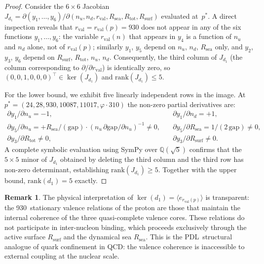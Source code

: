 \documentclass[11pt,a4paper]{article}
\theoremstyle{definition}
\newtheorem{remark}[theorem]{Remark}
\newcommand{\PDL}{\textnormal{PDL}}
\newcommand{\Rsurf}{R_{\mathrm{surf}}}
\newcommand{\Rsea}{R_{\mathrm{sea}}}
\newcommand{\Rtot}{R_{\mathrm{tot}}}
\newcommand{\rval}{r_{\mathrm{val}}}
\newcommand{\rank}{\mathrm{rank}}
\newcommand{\dmap}[1]{d_{#1}}
\newcommand{\vp}{\varphi}
\begin{document}
\begin{proof}
Consider the $6 \times 6$ Jacobian $J_{\dmap{1}} = \partial(y_1,\ldots,y_6)/\partial(n_u, n_d, \rval, \Rsea, \Rtot, \Rsurf)$ evaluated at~$p^*$. A direct inspection reveals that $\rval = \rval(p) = 930$ does not appear in any of the six functions $y_1,\ldots,y_6$: the variable $\rval(n)$ that appears in $y_4$ is a function of $n_u$ and $n_d$ alone, not of $\rval(p)$; similarly $y_1$, $y_5$ depend on $n_u$, $n_d$, $\Rsea$ only, and $y_2$, $y_3$, $y_6$ depend on $\Rsurf$, $\Rtot$, $n_u$, $n_d$. Consequently, the third column of $J_{\dmap{1}}$ (the column corresponding to $\partial/\partial\rval$) is identically zero, so $(0,0,1,0,0,0)^\top \in \ker(J_{\dmap{1}})$ and $\rank(J_{\dmap{1}}) \leq 5$.

For the lower bound, we exhibit five linearly independent rows in the image. At $p^* = (24, 28, 930, 10087, 11017, \vp \cdot 310)$ the non-zero partial derivatives are:
\begin{align*}
  \partial y_1/\partial n_u = -1, &\quad \partial y_1/\partial n_d = +1, \\
  \partial y_5/\partial n_u = +\Rsea/(\mathrm{gap}) \cdot (n_u\,\partial\mathrm{gap}/\partial n_u)^{-1} \neq 0, &\quad \partial y_5/\partial \Rsea = 1/(2\,\mathrm{gap}) \neq 0,\\
  \partial y_3/\partial \Rtot \neq 0, &\quad \partial y_3/\partial \Rsurf \neq 0.
\end{align*}
A complete symbolic evaluation using SymPy over $\mathbb{Q}(\sqrt{5})$ confirms that the $5 \times 5$ minor of $J_{\dmap{1}}$ obtained by deleting the third column and the third row has non-zero determinant, establishing $\rank(J_{\dmap{1}}) \geq 5$. Together with the upper bound, $\rank(\dmap{1}) = 5$ exactly.
\end{proof}

\begin{remark}
  \label{rem:confinement}
  The physical interpretation of $\ker(\dmap{1}) = \langle e_{\rval(p)}\rangle$ is transparent: the 930~stationary valence relations of the proton are those that maintain the internal coherence of the three quasi-complete valence cores. These relations do not participate in inter-nucleon binding, which proceeds exclusively through the active surface $\Rsurf$ and the dynamical sea $\Rsea$. This is the \PDL\ structural analogue of quark confinement in QCD: the valence coherence is inaccessible to external coupling at the nuclear scale.
\end{remark}
\end{document}
